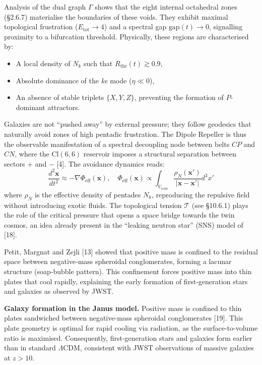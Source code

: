 \documentclass[11pt]{article}
\providecommand{\tightlist}{\setlength{\itemsep}{2pt}\setlength{\parskip}{6pt}}
\let\oldmathcal\mathcal
\renewcommand{\mathcal}[1]{\oldmathcal{#1}}
\providecommand{\tightlist}{%
  \setlength{\itemsep}{2pt}\setlength{\parskip}{6pt}
}
\begin{document}
Analysis of the dual graph \(\Gamma\) shows that the eight internal
octahedral zones (§2.6.7) materialise the boundaries of these voids.
They exhibit maximal topological frustration (\(E_{\text{tot}} \to 4\))
and a spectral gap \(\text{gap}(t) \to 0\), signalling proximity to a
bifurcation threshold. Physically, these regions are characterised by:

\begin{itemize}
\tightlist
\item
  A local density of \(N_k\) such that
  \(R_{\text{thr}}(t) \gtrsim 0.9\),
\item
  Absolute dominance of the \textit{ke} mode (\(\eta \ll 0\)),
\item
  An absence of stable triplets \(\{X,Y,Z\}\), preventing the formation
  of \(P\)-dominant attractors.
\end{itemize}

Galaxies are not ``pushed away'' by external pressure; they follow
geodesics that naturally avoid zones of high pentadic frustration. The
Dipole Repeller is thus the observable manifestation of a spectral
decoupling node between belts \(CP\) and \(CN\), where the
\(\text{Cl}(6,6)\) reservoir imposes a structural separation between
sectors \(+\) and \(-\) {[}4{]}. The avoidance dynamics reads: \[
\frac{d^2 \mathbf{x}}{dt^2} \approx -\nabla \Phi_{\text{eff}}(\mathbf{x}), \quad \Phi_{\text{eff}}(\mathbf{x}) \propto \int_{V_{\text{void}}} \frac{\rho_N(\mathbf{x}')}{|\mathbf{x} - \mathbf{x}'|} d^3x'
\] where \(\rho_N\) is the effective density of pentades \(N_k\),
reproducing the repulsive field without introducing exotic fluids. The
topological tension \(\mathcal{T}\) (see §10.6.1) plays the role of the
critical pressure that opens a space bridge towards the twin cosmos, an
idea already present in the ``leaking neutron star'' (SNS) model of
{[}18{]}.

Petit, Margnat and Zejli {[}13{]} showed that positive mass is confined
to the residual space between negative‑mass spheroidal conglomerates,
forming a lacunar structure (soap‑bubble pattern). This confinement
forces positive mass into thin plates that cool rapidly, explaining the
early formation of first‑generation stars and galaxies as observed by
JWST.

\textbf{Galaxy formation in the Janus model.} Positive mass is confined
to thin plates sandwiched between negative-mass spheroidal conglomerates
{[}19{]}. This plate geometry is optimal for rapid cooling via
radiation, as the surface-to-volume ratio is maximised. Consequently,
first-generation stars and galaxies form earlier than in standard
\(\Lambda\)CDM, consistent with JWST observations of massive galaxies at
\(z > 10\).
\end{document}
